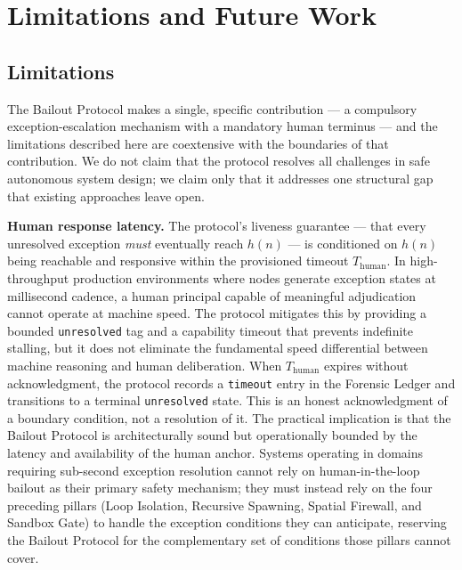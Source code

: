 \section{Limitations and Future Work}\label{sec:limitations}

\subsection{Limitations}

The Bailout Protocol makes a single, specific contribution — a compulsory exception-escalation mechanism with a mandatory human terminus — and the limitations described here are coextensive with the boundaries of that contribution. We do not claim that the protocol resolves all challenges in safe autonomous system design; we claim only that it addresses one structural gap that existing approaches leave open.

\medskip\noindent\textbf{Human response latency.}%
\label{sec:lim:latency}
The protocol's liveness guarantee — that every unresolved exception \emph{must} eventually reach $h(n)$ — is conditioned on $h(n)$ being reachable and responsive within the provisioned timeout $T_{\mathrm{human}}$. In high-throughput production environments where nodes generate exception states at millisecond cadence, a human principal capable of meaningful adjudication cannot operate at machine speed. The protocol mitigates this by providing a bounded \texttt{unresolved} tag and a capability timeout that prevents indefinite stalling, but it does not eliminate the fundamental speed differential between machine reasoning and human deliberation. When $T_{\mathrm{human}}$ expires without acknowledgment, the protocol records a \texttt{timeout} entry in the Forensic Ledger and transitions to a terminal \texttt{unresolved} state. This is an honest acknowledgment of a boundary condition, not a resolution of it. The practical implication is that the Bailout Protocol is architecturally sound but operationally bounded by the latency and availability of the human anchor. Systems operating in domains requiring sub-second exception resolution cannot rely on human-in-the-loop bailout as their primary safety mechanism; they must instead rely on the four preceding pillars (Loop Isolation, Recursive Spawning, Spatial Firewall, and Sandbox Gate) to handle the exception conditions they can anticipate, reserving the Bailout Protocol for the complementary set of conditions those pillars cannot cover.

